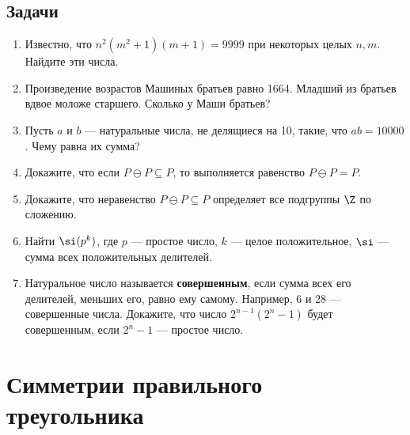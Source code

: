 \subsection*{Задачи}
\begin{enumerate}
\item Известно, что $n^2(m^2+1)(m+1)=9999$ при некоторых целых $n,m$. Найдите эти числа.
\item Произведение возрастов Машиных братьев равно 1664. Младший из братьев вдвое моложе старшего. Сколько у Маши братьев?
\item Пусть $a$ и $b$ --- натуральные числа, не делящиеся на 10, такие, что $ab=10000$. Чему равна их сумма?
\item Докажите, что если $P\ominus P\subseteq P$, то выполняется равенство $P\ominus P=P$.
\item Докажите, что неравенство $P\ominus P\subseteq P$ определяет все подгруппы $\Z$ по сложению.
\item Найти $\si(p^k)$, где $p$ --- простое число, $k$ --- целое положительное, $\si$ --- сумма всех положительных делителей.
\item Натуральное число называется \textbf{совершенным}, если сумма всех его делителей, меньших его, равно ему самому. Например, 6 и 28 --- совершенные числа. Докажите, что число $2^{n-1}(2^n-1)$ будет совершенным, если $2^n-1$ --- простое число.
\end{enumerate}

\section{Симметрии правильного треугольника}



